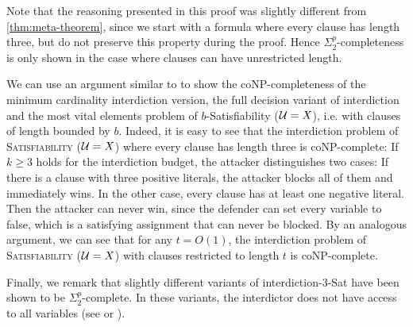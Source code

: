 Note that the reasoning presented in this proof was slightly different from \cref{thm:meta-theorem}, since we start with a formula where every clause has length three, but do not preserve this property during the proof.
Hence $\Sigma^p_2$-completeness is only shown in the case where clauses can have unrestricted length.

We can use an argument similar to  to show the coNP-completeness of the minimum cardinality interdiction version, the full decision variant of interdiction and the most vital elements problem of {\sc $b$-Satisfiability ($\mathcal{U} = X$)}, i.e. with clauses of length bounded by $b$.
Indeed, it is easy to see that the interdiction problem of \textsc{Satisfiability ($\mathcal{U} = X$)} where every clause has length three is coNP-complete:
If $k \geq 3$ holds for the interdiction budget, the attacker distinguishes two cases:
If there is a clause with three positive literals, the attacker blocks all of them and immediately wins. 
In the other case, every clause has at least one negative literal.
Then the attacker can never win, since the defender can set every variable to false, which is a satisfying assignment that can never be blocked.
By an analogous argument, we can see that for any $t = O(1)$, the interdiction problem of \textsc{Satisfiability ($\mathcal{U} = X$)} with clauses restricted to length $t$ is coNP-complete.

Finally, we remark that slightly different variants of interdiction-3-Sat have been shown to be $\Sigma^p_2$-complete. In these variants, the interdictor does not have access to all variables (see \cite[Sec. 4.2]{gruene2024completeness} or \cite[Thm. 1]{jackiewicz2024computational}).





















